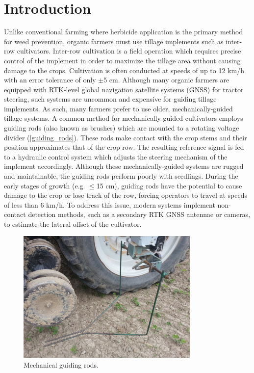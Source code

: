 \documentclass[authoryear]{elsarticle}
\begin{document}
\section{Introduction}
Unlike conventional farming where herbicide application is the primary
method for weed prevention, organic farmers must use tillage
implements such as inter-row cultivators. Inter-row cultivation is a
field operation which requires precise control of the implement in
order to maximize the tillage area without causing damage to the
crops. Cultivation is often conducted at speeds of up to 12 km/h with
an error tolerance of only $\pm$5 cm. Although many organic farmers are equipped
with RTK-level global navigation satellite systems (GNSS) for tractor
steering, such systems are uncommon and expensive for guiding tillage
implements. As such, many farmers prefer to use older,
mechanically-guided tillage systems. A common method for
mechanically-guided cultivators employs guiding rods (also known as
brushes) which are mounted to a rotating voltage divider
(\ref{guiding_rods}). These rods make contact with the crop stems and
their position approximates that of the crop row. The resulting reference
signal is fed to a hydraulic control system which adjusts the steering
mechanism of the implement accordingly. Although these
mechanically-guided systems are rugged and maintainable, the guiding
rods perform poorly with seedlings. During the early stages of growth
(e.g. $\le$15 cm), guiding rods have the potential to cause damage to
the crop or lose track of the row, forcing operators to travel at
speeds of less than 6 km/h. To address this issue, modern systems
implement non-contact detection methods, such as a secondary RTK GNSS
antennae or cameras, to estimate the lateral offset of the cultivator.

\begin{figure}
  \centering
  \includegraphics[width=0.8\textwidth,natwidth=610,natheight=642]{guiding_rods.jpg}
  \caption{Mechanical guiding rods.}
  \label{fig:guiding_rods}
\end{figure}
\end{document}
